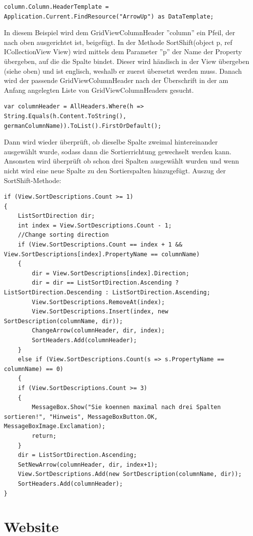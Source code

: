 \begin{lstlisting}
column.Column.HeaderTemplate = Application.Current.FindResource("ArrowUp") as DataTemplate;
\end{lstlisting}
In diesem Beispiel wird dem GridViewColumnHeader ''column'' ein Pfeil, der nach oben ausgerichtet ist, beigefügt. \newline
In der Methode SortShift(object p, ref ICollectionView View) wird mittels dem Parameter ''p'' der Name der Property übergeben, auf die die Spalte bindet. Dieser wird händisch in der View übergeben (siehe oben) und ist englisch, weshalb er zuerst übersetzt werden muss. Danach wird der passende GridViewColumnHeader nach der Überschrift in der am Anfang angelegten Liste von GridViewColumnHeaders gesucht.
\begin{lstlisting}
var columnHeader = AllHeaders.Where(h => String.Equals(h.Content.ToString(), germanColumnName)).ToList().FirstOrDefault();
\end{lstlisting}
Dann wird wieder überprüft, ob dieselbe Spalte zweimal hintereinander ausgewählt wurde, sodass dann die Sortierrichtung gewechselt werden kann. Ansonsten wird überprüft ob schon drei Spalten ausgewählt wurden und wenn nicht wird eine neue Spalte zu den Sortierspalten hinzugefügt.
Auszug der SortShift-Methode:

\begin{lstlisting}
if (View.SortDescriptions.Count >= 1)
{
	ListSortDirection dir;
	int index = View.SortDescriptions.Count - 1;
	//Change sorting direction
	if (View.SortDescriptions.Count == index + 1 && View.SortDescriptions[index].PropertyName == columnName)
	{
		dir = View.SortDescriptions[index].Direction;
		dir = dir == ListSortDirection.Ascending ? ListSortDirection.Descending : ListSortDirection.Ascending;
		View.SortDescriptions.RemoveAt(index);
		View.SortDescriptions.Insert(index, new SortDescription(columnName, dir));
		ChangeArrow(columnHeader, dir, index);
		SortHeaders.Add(columnHeader);
	}
	else if (View.SortDescriptions.Count(s => s.PropertyName == columnName) == 0)
	{
	if (View.SortDescriptions.Count >= 3)
	{
		MessageBox.Show("Sie koennen maximal nach drei Spalten sortieren!", "Hinweis", MessageBoxButton.OK, MessageBoxImage.Exclamation);
		return;
	}
	dir = ListSortDirection.Ascending;
	SetNewArrow(columnHeader, dir, index+1);
	View.SortDescriptions.Add(new SortDescription(columnName, dir));
	SortHeaders.Add(columnHeader);
}
\end{lstlisting}


\section{Website}
